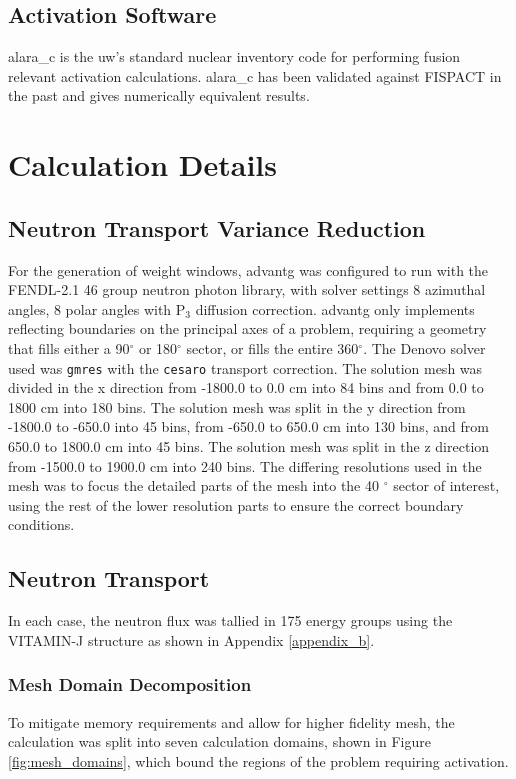 \documentclass[12pt]{article}
\begin{document}
\subsection{Activation Software}
\gls{alara_c} is the \gls{uw}'s standard nuclear inventory code for performing
fusion relevant activation calculations. \gls{alara_c} has been validated against 
FISPACT \cite{fispact} in the past and gives numerically equivalent results. 

\newpage
\clearpage
\section{Calculation Details}

\subsection{Neutron Transport Variance Reduction}

For the generation of weight windows, \gls{advantg} was configured to run
with the FENDL-2.1 46 group neutron photon library, with solver settings
8 azimuthal angles, 8 polar angles with P$_3$ diffusion correction. 
\gls{advantg} only implements reflecting boundaries on the principal axes of a 
problem, requiring a geometry that fills either a 90$^{\circ}$ or 180$^{\circ}$ 
sector, or fills the entire 360$^{\circ}$.  The Denovo
solver used was \texttt{gmres} with the \texttt{cesaro} transport correction. 
The solution mesh was divided in the x direction from -1800.0 to 0.0 cm into 84 bins and 
from 0.0 to 1800 cm into 180 bins. The solution mesh was split in the y direction from 
-1800.0 to -650.0 into 45 bins, from -650.0 to 650.0 cm into 130 bins, and from 650.0 
to 1800.0 cm into 45 bins. The solution mesh was split in the z direction from -1500.0
to 1900.0 cm into 240 bins. The differing resolutions used in the mesh was to
focus the detailed parts of the mesh into the 40 $^{\circ}$ sector of interest,
using the rest of the lower resolution parts to ensure the correct boundary conditions.

\subsection{Neutron Transport}

In each case, the neutron flux was tallied in 175 energy groups using the
VITAMIN-J structure \cite{vitaminj} as shown in Appendix \ref{appendix_b}.

\subsubsection{Mesh Domain Decomposition}
To mitigate memory requirements and allow for higher fidelity mesh, the
calculation was split into seven calculation domains, shown in Figure
\ref{fig:mesh_domains}, which bound the regions of the problem requiring
activation.
\end{document}
